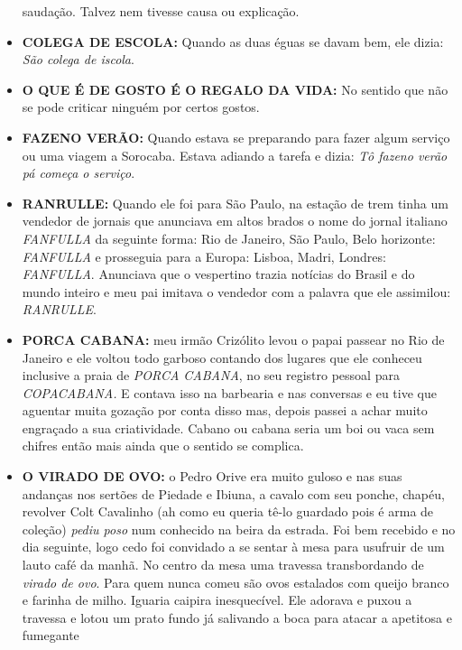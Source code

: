 \documentclass[12pt,brazil,]{book}
\begin{document}
\begin{itemize}
  saudação. Talvez nem tivesse causa ou explicação.\\
\item
  \textbf{COLEGA DE ESCOLA:} Quando as duas éguas se davam bem, ele
  dizia: \emph{São colega de iscola}.\\
\item
  \textbf{O QUE É DE GOSTO É O REGALO DA VIDA:} No sentido que não se
  pode criticar ninguém por certos gostos.\\
\item
  \textbf{FAZENO VERÃO:} Quando estava se preparando para fazer algum
  serviço ou uma viagem a Sorocaba. Estava adiando a tarefa e dizia:
  \emph{Tô fazeno verão pá começa o serviço}.\\
\item
  \textbf{RANRULLE:} Quando ele foi para São Paulo, na estação de trem
  tinha um vendedor de jornais que anunciava em altos brados o nome do
  jornal italiano \emph{FANFULLA} da seguinte forma: Rio de Janeiro, São
  Paulo, Belo horizonte: \emph{FANFULLA} e prosseguia para a Europa:
  Lisboa, Madri, Londres: \emph{FANFULLA}. Anunciava que o vespertino
  trazia notícias do Brasil e do mundo inteiro e meu pai imitava o
  vendedor com a palavra que ele assimilou: \emph{RANRULLE}.\\
\item
  \textbf{PORCA CABANA:} meu irmão Crizólito levou o papai passear no
  Rio de Janeiro e ele voltou todo garboso contando dos lugares que ele
  conheceu inclusive a praia de \emph{PORCA CABANA}, no seu registro
  pessoal para \emph{COPACABANA.} E contava isso na barbearia e nas
  conversas e eu tive que aguentar muita gozação por conta disso mas,
  depois passei a achar muito engraçado a sua criatividade. Cabano ou
  cabana seria um boi ou vaca sem chifres então mais ainda que o sentido
  se complica.
\item
  \textbf{O VIRADO DE OVO:} o Pedro Orive era muito guloso e nas suas
  andanças nos sertões de Piedade e Ibiuna, a cavalo com seu ponche,
  chapéu, revolver Colt Cavalinho (ah como eu queria tê-lo guardado pois
  é arma de coleção) \emph{pediu poso} num conhecido na beira da
  estrada. Foi bem recebido e no dia seguinte, logo cedo foi convidado a
  se sentar à mesa para usufruir de um lauto café da manhã. No centro da
  mesa uma travessa transbordando de \emph{virado de ovo}. Para quem
  nunca comeu são ovos estalados com queijo branco e farinha de milho.
  Iguaria caipira inesquecível. Ele adorava e puxou a travessa e lotou
  um prato fundo já salivando a boca para atacar a apetitosa e fumegante

\end{itemize}
\end{document}
